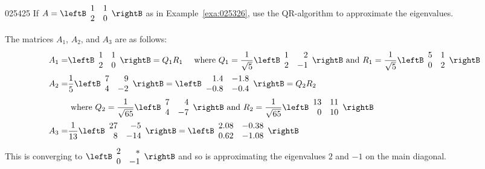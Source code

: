 \begin{example}{}{025425}
If $A = \leftB \begin{array}{rr}
1 & 1 \\
2 & 0
\end{array}\rightB$ as in Example~\ref{exa:025326}, use the QR-algorithm to approximate the eigenvalues.


\begin{solution}
  The matrices $A_{1}$, $A_{2}$, and $A_{3}$ are as follows:
\begin{align*}
A_{1} = & \leftB \begin{array}{rr}
1 & 1 \\
2 & 0
\end{array}\rightB = Q_{1}R_{1} \quad \mbox{ where } Q_{1} = \frac{1}{\sqrt{5}}\leftB \begin{array}{rr}
1 & 2 \\
2 & -1
\end{array}\rightB \mbox{ and } R_{1} =  \frac{1}{\sqrt{5}}\leftB \begin{array}{rr}
5 & 1 \\
0 & 2
\end{array}\rightB \\
A_{2} = & \frac{1}{5}\leftB \begin{array}{rr}
7 & 9 \\
4 & -2
\end{array}\rightB = \leftB \begin{array}{rr}
1.4 & -1.8 \\
-0.8 & -0.4
\end{array}\rightB= Q_{2}R_{2} \\
&\mbox{ where } Q_{2} = \frac{1}{\sqrt{65}}\leftB \begin{array}{rr}
7 & 4 \\
4 & -7
\end{array}\rightB \mbox{ and } R_{2} =  \frac{1}{\sqrt{65}}\leftB \begin{array}{rr}
13 & 11 \\
0 & 10
\end{array}\rightB \\
A_{3} = &\frac{1}{13}\leftB \begin{array}{rr}
27 & -5 \\
8 & -14
\end{array}\rightB = \leftB \begin{array}{rr}
2.08 & -0.38 \\
0.62 & -1.08
\end{array}\rightB
\end{align*}
This is converging to $\leftB \begin{array}{rr}
2 & \ast \\
0 & -1
\end{array}\rightB$ and so is approximating the eigenvalues $2$ and $-1$ on the main diagonal.
\end{solution}
\end{example}

